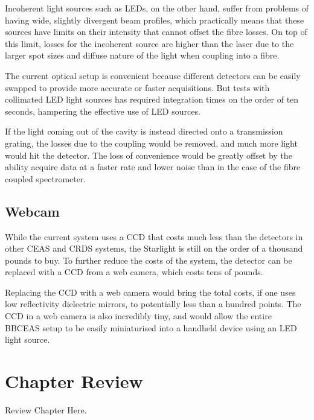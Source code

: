 Incoherent light sources such as \acp{LED}, on the other hand, suffer from
problems of having wide, slightly divergent beam profiles, which practically
means that these sources have limits on their intensity that cannot offset the
fibre losses. On top of this limit, losses for the incoherent source are
higher than the laser due to the larger spot sizes and diffuse nature of the
light when coupling into a fibre.

The current optical setup is convenient because different detectors can be
easily swapped to provide more accurate or faster acquisitions. But tests with
collimated \ac{LED} light sources has required integration
times on the order of ten seconds, hampering the effective use of \ac{LED}
sources.

If the light coming out of the cavity is instead directed onto a transmission
grating, the losses due to the coupling would be removed, and much more light
would hit the detector. The loss of convenience would be greatly offset by the
ability acquire data at a faster rate and lower noise than in the case of the
fibre coupled spectrometer.

\subsection{Webcam}

While the current system uses a \ac{CCD} that costs much less than the
detectors in other \ac{CEAS} and \ac{CRDS} systems, the Starlight is still on
the order of a thousand pounds to buy. To further reduce the costs of the
system, the detector can be replaced with a \ac{CCD} from a web camera, which
costs tens of pounds.

Replacing the \ac{CCD} with a web camera would bring the total costs, if one
uses low reflectivity dielectric mirrors, to potentially less than a hundred
points. The \ac{CCD} in a web camera is also incredibly tiny, and would allow
the entire \ac{BBCEAS} setup to be easily miniaturised into a handheld device
using an \ac{LED} light source.

\section*{Chapter Review}
Review Chapter Here.
